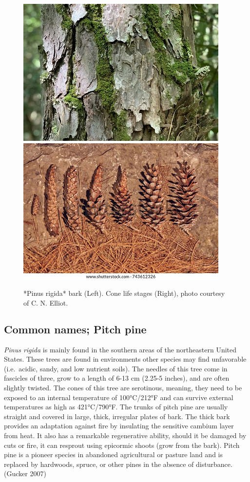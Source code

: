 \documentclass[
]{article}
\begin{document}
\begin{figure}

{\centering \includegraphics[width=0.5\linewidth]{p rigida bark} \includegraphics[width=0.5\linewidth]{pitch pine cones} 

}

\caption{*Pinus rigida* bark (Left). Cone life stages (Right), photo courtesy of C. N. Elliot.}\label{fig:rigida}
\end{figure}

\hypertarget{common-names-pitch-pine}{%
\subsection{Common names; Pitch pine}\label{common-names-pitch-pine}}

\emph{Pinus rigida} is mainly found in the southern areas of the northeastern United States. These trees are found in environments other species may find unfavorable (i.e.~acidic, sandy, and low nutrient soils). The needles of this tree come in fascicles of three, grow to a length of 6-13 cm (2.25-5 inches), and are often slightly twisted. The cones of this tree are serotinous, meaning, they need to be exposed to an internal temperature of 100°C/212°F and can survive external temperatures as high as 421°C/790°F. The trunks of pitch pine are usually straight and covered in large, thick, irregular plates of bark. The thick bark provides an adaptation against fire by insulating the sensitive cambium layer from heat. It also has a remarkable regenerative ability, should it be damaged by cuts or fire, it can resprout using epicormic shoots (grow from the bark). Pitch pine is a pioneer species in abandoned agricultural or pasture land and is replaced by hardwoods, spruce, or other pines in the absence of disturbance. (Gucker 2007)
\end{document}
